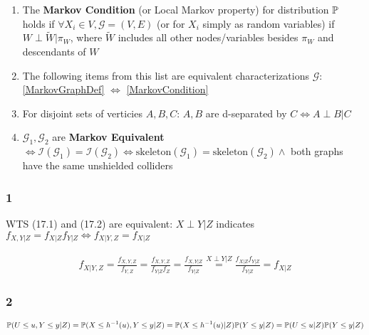 \documentclass[11pt]{article}
\begin{document}
\begin{enumerate}
    \item \label{MarkovCondition} The \textbf{Markov Condition} (or Local Markov property) for distribution $\mathbb{P}$ holds if $\forall X_i \in V, \mathcal{G}=(V,E)$ (or for $X_i$ simply as random variables) if $W \perp \tilde{W} | \pi_W$, where $\tilde{W}$ includes all other nodes/variables besides $\pi_W$ and descendants of $W$ 


    \item The following items from this list are equivalent characterizations $\mathcal{G}$: \ref{MarkovGraphDef} $\Leftrightarrow$
    \ref{MarkovCondition} 

    \item For disjoint sets of verticies $A,B,C$: $A,B$ are d-separated by $C \Leftrightarrow A \perp B | C$ 

    \item $\mathcal{G}_1, \mathcal{G}_2$ are \textbf{Markov Equivalent} $\Leftrightarrow \mathcal{I}(\mathcal{G}_1) = \mathcal{I}(\mathcal{G}_2) \Leftrightarrow \text{skeleton}(\mathcal{G}_1) = \text{skeleton}(\mathcal{G}_2) \land $ both graphs have the same unshielded colliders 
\end{enumerate}



\subsubsection{1}

WTS (17.1) and (17.2) are equivalent: $X\perp Y |Z$ indicates
$f_{X,Y|Z}=f_{X|Z}f_{Y|Z} \Leftrightarrow f_{X|Y,Z} = f_{X|Z}$

\begin{gather*}
    f_{X|Y,Z}
    =
    \frac{ f_{X, Y, Z} }{ f_{Y, Z} }
    =
    \frac{ f_{X, Y, Z} }{ f_{Y|Z} f_Z }
    =
    \frac{ f_{X, Y | Z} }{ f_{Y|Z}}    
    \stackrel{X \perp Y |Z}{=}
    \frac{ f_{X| Z} f_{Y|Z} }{ f_{Y|Z}}    
    =
    f_{X|Z}
\end{gather*}

\subsubsection{2}

\begin{gather*}
    \mathbb{P} (U\leq u, Y \leq y | Z)
        =
    \mathbb{P} (X \leq h^{-1}(u), Y \leq y | Z)
    =
    \mathbb{P} (X \leq h^{-1}(u)|Z)
    \mathbb{P} ( Y \leq y | Z)
    =
    \mathbb{P} (U \leq u|Z)
    \mathbb{P} ( Y \leq y | Z)    
\end{gather*}
\end{document}
